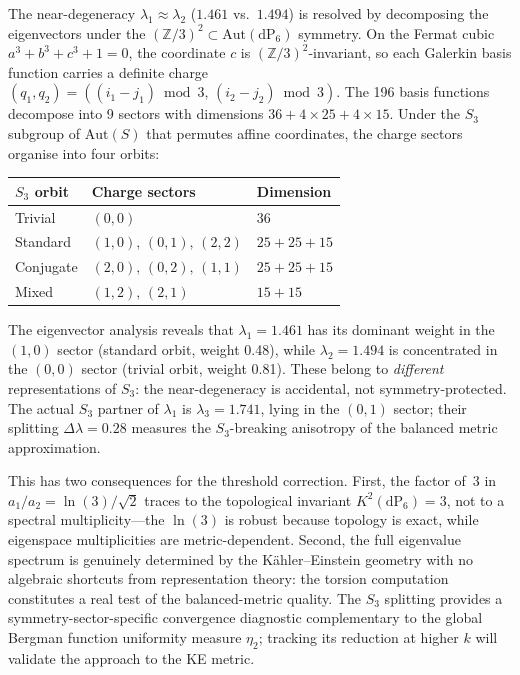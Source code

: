 The near-degeneracy $\lambda_1 \approx \lambda_2$ ($1.461$ vs.\ $1.494$) is resolved by decomposing the eigenvectors under the $(\mathbb{Z}/3)^2 \subset \mathrm{Aut}(\mathrm{dP}_6)$ symmetry.  On the Fermat cubic $a^3 + b^3 + c^3 + 1 = 0$, the coordinate $c$ is $(\mathbb{Z}/3)^2$-invariant, so each Galerkin basis function carries a definite charge $(q_1, q_2) = ((i_1 - j_1) \bmod 3,\, (i_2 - j_2) \bmod 3)$.  The 196 basis functions decompose into 9 sectors with dimensions $36 + 4 \times 25 + 4 \times 15$.  Under the $S_3$ subgroup of $\mathrm{Aut}(S)$ that permutes affine coordinates, the charge sectors organise into four orbits:
\begin{center}
\begin{tabular}{@{}lll@{}}
\toprule
$S_3$ orbit & Charge sectors & Dimension \\
\midrule
Trivial & $(0,0)$ & 36 \\
Standard & $(1,0),\,(0,1),\,(2,2)$ & $25 + 25 + 15$ \\
Conjugate & $(2,0),\,(0,2),\,(1,1)$ & $25 + 25 + 15$ \\
Mixed & $(1,2),\,(2,1)$ & $15 + 15$ \\
\bottomrule
\end{tabular}
\end{center}
The eigenvector analysis reveals that $\lambda_1 = 1.461$ has its dominant weight in the $(1,0)$ sector (standard orbit, weight 0.48), while $\lambda_2 = 1.494$ is concentrated in the $(0,0)$ sector (trivial orbit, weight 0.81).  These belong to \emph{different} representations of $S_3$: the near-degeneracy is accidental, not symmetry-protected.  The actual $S_3$ partner of $\lambda_1$ is $\lambda_3 = 1.741$, lying in the $(0,1)$ sector; their splitting $\Delta\lambda = 0.28$ measures the $S_3$-breaking anisotropy of the balanced metric approximation.

This has two consequences for the threshold correction.  First, the factor of~3 in $a_1/a_2 = \ln(3)/\sqrt{2}$ traces to the topological invariant $K^2(\mathrm{dP}_6) = 3$, not to a spectral multiplicity---the $\ln(3)$ is robust because topology is exact, while eigenspace multiplicities are metric-dependent.  Second, the full eigenvalue spectrum is genuinely determined by the K\"ahler--Einstein geometry with no algebraic shortcuts from representation theory: the torsion computation constitutes a real test of the balanced-metric quality.  The $S_3$ splitting provides a symmetry-sector-specific convergence diagnostic complementary to the global Bergman function uniformity measure $\eta_2$; tracking its reduction at higher $k$ will validate the approach to the KE metric.

